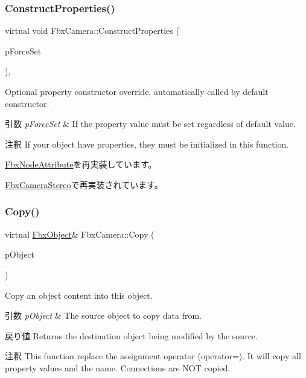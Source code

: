 \subsubsection{\texorpdfstring{Construct\+Properties()}{ConstructProperties()}}
{\footnotesize\ttfamily virtual void Fbx\+Camera\+::\+Construct\+Properties (\begin{DoxyParamCaption}\item[{bool}]{p\+Force\+Set }\end{DoxyParamCaption})\hspace{0.3cm}{\ttfamily [protected]}, {\ttfamily [virtual]}}

Optional property constructor override, automatically called by default constructor. 
\begin{DoxyParams}{引数}
{\em p\+Force\+Set} & If the property value must be set regardless of default value. \\
\hline
\end{DoxyParams}
\begin{DoxyRemark}{注釈}
If your object have properties, they must be initialized in this function. 
\end{DoxyRemark}


\hyperlink{class_fbx_node_attribute_a042eb9949a9b9634dcc5f126e82fd04a}{Fbx\+Node\+Attribute}を再実装しています。



\hyperlink{class_fbx_camera_stereo_a83a9b1ee59d0014b30411fe4877b5dec}{Fbx\+Camera\+Stereo}で再実装されています。

\mbox{\label{class_fbx_camera_ad6641b4f04167df79531fe4843834895}} 
\subsubsection{\texorpdfstring{Copy()}{Copy()}}
{\footnotesize\ttfamily virtual \hyperlink{class_fbx_object}{Fbx\+Object}\& Fbx\+Camera\+::\+Copy (\begin{DoxyParamCaption}\item[{const \hyperlink{class_fbx_object}{Fbx\+Object} \&}]{p\+Object }\end{DoxyParamCaption})\hspace{0.3cm}{\ttfamily [virtual]}}

Copy an object content into this object. 
\begin{DoxyParams}{引数}
{\em p\+Object} & The source object to copy data from. \\
\hline
\end{DoxyParams}
\begin{DoxyReturn}{戻り値}
Returns the destination object being modified by the source. 
\end{DoxyReturn}
\begin{DoxyRemark}{注釈}
This function replace the assignment operator (operator=). It will copy all property values and the name. Connections are N\+OT copied. 
\end{DoxyRemark}


